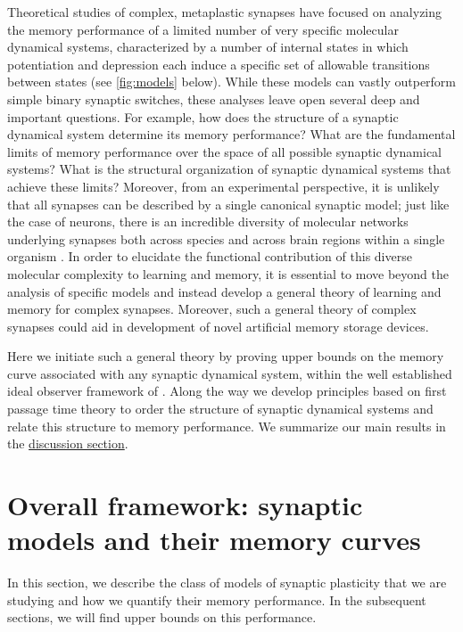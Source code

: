 \documentclass{article} %
\begin{document}
Theoretical studies of complex, metaplastic synapses have focused on analyzing the memory performance of a limited number of very specific molecular dynamical systems, characterized by a number of internal states in which potentiation and depression each induce a specific set of allowable transitions between states (\eg see \autoref{fig:models} below).
While these models can vastly outperform simple binary synaptic switches, these analyses leave open several deep and important questions.
For example, how does the structure of a synaptic dynamical system determine its memory performance?  What are the fundamental limits of memory performance over the space of all possible synaptic dynamical systems?
What is the structural organization of synaptic dynamical systems that achieve these limits?
Moreover, from an experimental perspective, it is unlikely that all synapses can be described by a single canonical synaptic model;  just like the case of neurons, there is an incredible diversity of molecular networks underlying synapses both across species and across brain regions within a single organism \cite{Emes2012synapserev}.
In order to elucidate the functional contribution of this diverse molecular complexity to learning and memory, it is essential to move beyond the analysis of specific models and instead develop a general theory of learning and memory for complex synapses.
Moreover, such a general theory of complex synapses could aid in development of novel artificial memory storage devices.  %

Here we initiate such a general theory by proving upper bounds on the memory curve associated with any synaptic dynamical system, within the well established ideal
observer framework of \cite{Fusi2005cascade,Fusi2007multistate,Barrett2008discrete}.
Along the way we develop principles based on first passage time theory to order the structure of synaptic dynamical systems and relate this structure to memory performance.
We summarize our main results in the \hyperref[sec:disc]{discussion section}.





\section{Overall framework: synaptic models and their memory curves}\label{sec:setup}

In this section, we describe the class of models of synaptic plasticity that we are studying and how we quantify their memory performance.
In the subsequent sections, we will find upper bounds on this performance.
\end{document}
